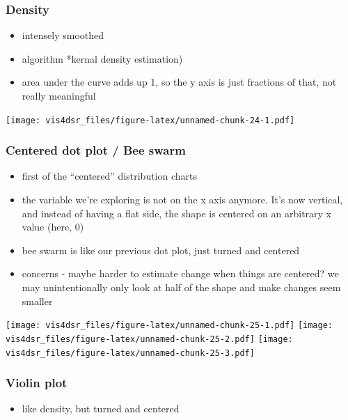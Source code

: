 \documentclass[
]{krantz}
\providecommand{\tightlist}{%
  \setlength{\itemsep}{0pt}\setlength{\parskip}{0pt}}
\begin{document}
\hypertarget{density}{%
\subsubsection{Density}\label{density}}

\begin{itemize}
\tightlist
\item
  intensely smoothed
\item
  algorithm *kernal density estimation)
\item
  area under the curve adds up 1, so the y axis is just fractions of that, not
  really meaningful
\end{itemize}

\texttt{[image: vis4dsr\_files/figure-latex/unnamed-chunk-24-1.pdf]}

\hypertarget{centered-dot-plot-bee-swarm}{%
\subsubsection{Centered dot plot / Bee swarm}\label{centered-dot-plot-bee-swarm}}

\begin{itemize}
\tightlist
\item
  first of the ``centered'' distribution charts
\item
  the variable we're exploring is not on the x axis anymore. It's now vertical,
  and instead of having a flat side, the shape is centered on an arbitrary x value (here, 0)
\item
  bee swarm is like our previous dot plot, just turned and centered
\item
  concerns - maybe harder to estimate change when things are centered? we may unintentionally
  only look at half of the shape and make changes seem smaller
\end{itemize}

\texttt{[image: vis4dsr\_files/figure-latex/unnamed-chunk-25-1.pdf]} \texttt{[image: vis4dsr\_files/figure-latex/unnamed-chunk-25-2.pdf]} \texttt{[image: vis4dsr\_files/figure-latex/unnamed-chunk-25-3.pdf]}

\hypertarget{violin-plot}{%
\subsubsection{Violin plot}\label{violin-plot}}

\begin{itemize}
\tightlist
\item
  like density, but turned and centered
\end{itemize}
\end{document}
